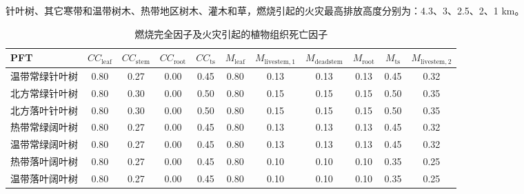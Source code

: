 针叶树、其它寒带和温带树木、热带地区树木、灌木和草，燃烧引起的火灾最高排放高度分别为：4.3、3、2.5、2、1 km。
\begin{landscape}
  \begin{table}[htbp]
    \caption{燃烧完全因子及火灾引起的植物组织死亡因子}
    \label{tab:burning_factors}
    \begin{tabular}{lcccccccccc}
      \toprule
      PFT              & $CC_{\mathrm{leaf}}$ & $CC_{\mathrm{stem}}$ & $CC_{\mathrm{root}}$ & $CC_{\mathrm{ts}}$ & $M_{\mathrm{leaf}}$ & $M_{\mathrm{livestem,1}}$ & $M_{\mathrm{deadstem}}$ & $M_{\mathrm{root}}$ & $M_{\mathrm{ts}}$ & $M_{\mathrm{livestem,2}}$ \\ \midrule
      温带常绿针叶树   & 0.80                 & 0.27                 & 0.00                 & 0.45               & 0.80                & 0.13                      & 0.13                    & 0.13                & 0.45              & 0.32                      \\
      北方常绿针叶树   & 0.80                 & 0.30                 & 0.00                 & 0.50               & 0.80                & 0.15                      & 0.15                    & 0.15                & 0.50              & 0.35                      \\
      北方落叶针叶树   & 0.80                 & 0.30                 & 0.00                 & 0.50               & 0.80                & 0.15                      & 0.15                    & 0.15                & 0.50              & 0.35                      \\
      热带常绿阔叶树   & 0.80                 & 0.27                 & 0.00                 & 0.45               & 0.80                & 0.13                      & 0.13                    & 0.13                & 0.45              & 0.32                      \\
      温带常绿阔叶树   & 0.80                 & 0.27                 & 0.00                 & 0.45               & 0.80                & 0.13                      & 0.13                    & 0.13                & 0.45              & 0.32                      \\
      热带落叶阔叶树   & 0.80                 & 0.27                 & 0.00                 & 0.45               & 0.80                & 0.10                      & 0.10                    & 0.10                & 0.35              & 0.25                      \\
      温带落叶阔叶树   & 0.80                 & 0.27                 & 0.00                 & 0.45               & 0.80                & 0.10                      & 0.10                    & 0.10                & 0.35              & 0.25                      \\

\end{tabular}
\end{table}
\end{landscape}
